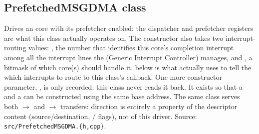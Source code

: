 \subsection{PrefetchedMSGDMA class}
\label{subsec:fpgasteel-prefetched-msgdma}

Drives an  core with its prefetcher enabled: the dispatcher  and prefetcher  registers are what this class actually operates on. The constructor also takes two interrupt-routing values: , the number that identifies this core's completion interrupt among all the interrupt lines the  (Generic Interrupt Controller) manages, and , a bitmask of which  core(s) should handle it.  below is what actually uses  to tell the  which interrupts to route to this class's callback. One more constructor parameter, , is only recorded: this class never reads it back. It exists so that a  and a  can be constructed using the same base address. The same class serves both $\rightarrow$ and $\rightarrow$ transfers: direction is entirely a property of the descriptor content (source/destination, / flags), not of this driver. Source: \lstinline[style=inlineFsRepo]!src/PrefetchedMSGDMA.{h,cpp}!.

